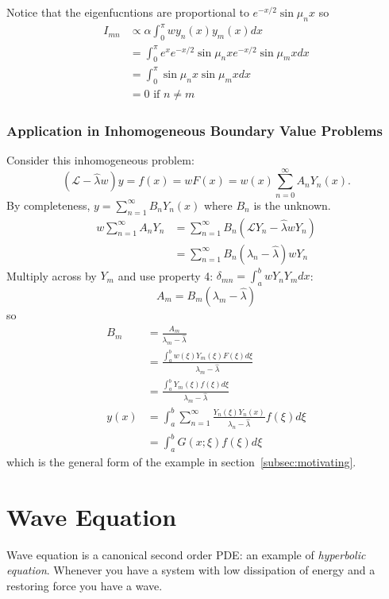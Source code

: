 \documentclass[a4paper]{article}
\renewcommand*\L{\mathcal{L}}
\begin{document}
\begin{enumerate}
Notice that the eigenfucntions are proportional to \(e^{-x/2}\sin\mu_nx\) so
\begin{align*}
  I_{mn} &\propto \alpha\int_{0}^{\pi} wy_n(x)y_m(x) dx \\
         &= \int_{0}^{\pi} e^x e^{-x/2}\sin\mu_nx e^{-x/2}\sin\mu_mx dx \\
         &= \int_{0}^{\pi} \sin\mu_nx \sin\mu_mx dx \\
         &= 0 \text{ if } n \neq m
\end{align*}
\end{enumerate}

\subsubsection{Application in Inhomogeneous Boundary Value Problems}

Consider this inhomogeneous problem:
\[
  (\L - \hat \lambda w)y = f(x) = wF(x) = w(x) \sum_{n=0}^{\infty} A_nY_n(x).
\]
By completeness, \(y = \sum_{n=1}^{\infty} B_nY_n(x) \) where \(B_n\) is the unknown.
\begin{align*}
  w \sum_{n=1}^{\infty}A_nY_n &= \sum_{n=1}^{\infty}B_n (\L Y_n - \hat \lambda w Y_n) \\
  &= \sum_{n=1}^{\infty}B_n(\lambda_n-\hat \lambda)wY_n
\end{align*}
Multiply across by \(Y_m\) and use property 4: \(\delta_{mn} = \int_{a}^{b} wY_nY_m dx \):
\[
  A_m = B_m(\lambda_m-\hat \lambda)
\]
so
\begin{align*}
  B_m &= \frac{A_m}{\lambda_m-\hat\lambda} \\
      &= \frac{\int_{a}^{b} w(\xi)Y_m(\xi)F(\xi) d\xi}{\lambda_m-\hat\lambda} \\
      &= \frac{\int_{a}^{b} Y_m(\xi)f(\xi) d\xi}{\lambda_m-\hat\lambda} \\ 
  y(x) &= \int_{a}^{b}  \sum_{n=1}^{\infty} \frac{Y_n(\xi)Y_n(x)}{\lambda_n-\hat \lambda} f(\xi) d\xi \\
      &= \int_{a}^{b} G(x;\xi)f(\xi) d\xi
\end{align*}
which is the general form of the example in section~\ref{subsec:motivating}.


\section{Wave Equation}

Wave equation is a canonical second order PDE: an example of \emph{hyperbolic equation}. Whenever you have a system with low dissipation of energy and a restoring force you have a wave.
\end{document}
